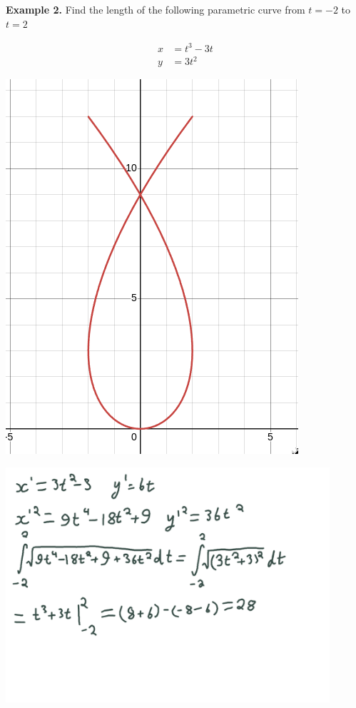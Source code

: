\documentclass[12pt]{extarticle}
\begin{document}
\textbf{Example 2.} Find the length of the following parametric curve from $t = -2$ to $t = 2$

\begin{align} 
    x &= t^3 - 3t \\ 
    y &= 3t^2  
\end{align}

\begin{center}
    \includegraphics[height = 0.3\textheight]{Graph.png}
\end{center}

\begin{center}
    \includegraphics[width = 0.9\textwidth]{assignment0004.png}
\end{center}
\end{document}
